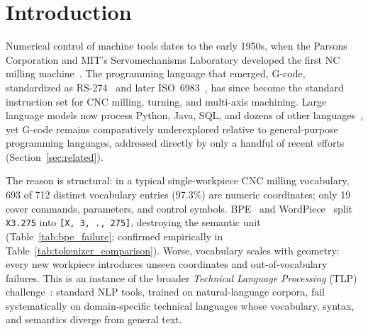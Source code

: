 \documentclass[sensors,article,submit,moreauthors,pdftex]{Definitions/mdpi}
\begin{document}
\maketitle

\section{Introduction}
\label{sec:introduction}

Numerical control of machine tools dates to the early 1950s, when the Parsons Corporation and MIT's Servomechanisms Laboratory developed the first NC milling machine~\cite{parsons_nc}. The programming language that emerged, G-code, standardized as RS-274~\cite{rs274d} and later ISO~6983~\cite{iso6983}, has since become the standard instruction set for CNC milling, turning, and multi-axis machining. Large language models now process Python, Java, SQL, and dozens of other languages~\cite{codex,codellama,starcoder}, yet G-code remains comparatively underexplored relative to general-purpose programming languages, addressed directly by only a handful of recent efforts (Section~\ref{sec:related}).

The reason is structural: in a typical single-workpiece CNC milling vocabulary, 693 of 712 distinct vocabulary entries (97.3\%) are numeric coordinates; only 19 cover commands, parameters, and control symbols. BPE~\cite{bpe} and WordPiece~\cite{wordpiece} split \texttt{X3.275} into \texttt{[X, 3, ., 275]}, destroying the semantic unit (Table~\ref{tab:bpe_failure}; confirmed empirically in Table~\ref{tab:tokenizer_comparison}). Worse, vocabulary scales with geometry: every new workpiece introduces unseen coordinates and out-of-vocabulary failures. This is an instance of the broader \emph{Technical Language Processing} (TLP) challenge~\cite{tlp_foundational}: standard NLP tools, trained on natural-language corpora, fail systematically on domain-specific technical languages whose vocabulary, syntax, and semantics diverge from general text.
\end{document}
